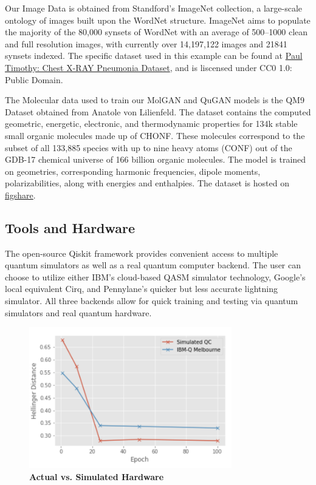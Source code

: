 \documentclass{scrartcl}
\begin{document}
Our Image Data is obtained from Standford's ImageNet collection, a large-scale ontology of images built upon the WordNet structure. ImageNet aims to populate the majority of the 80,000 synsets of WordNet with an average of 500–1000 clean and full resolution images, with currently over 14,197,122 images and 21841 synsets indexed. The specific dataset used in this example can be found at \href{https://www.kaggle.com/paultimothymooney/chest-xray-pneumonia}{Paul Timothy: Chest X-RAY Pneumonia Dataset}, and is liscensed under CC0 1.0: Public Domain.

The Molecular data used to train our MolGAN and QuGAN models is the QM9 Dataset obtained from Anatole von Lilienfeld. The dataset contains the computed geometric, energetic, electronic, and thermodynamic properties for 134k stable small organic molecules made up of CHONF. These molecules correspond to the subset of all 133,885 species with up to nine heavy atoms (CONF) out of the GDB-17 chemical universe of 166 billion organic molecules. The model is trained on geometries, corresponding harmonic frequencies, dipole moments, polarizabilities, along with energies and enthalpies. The dataset is hosted on \href{https://doi.org/10.6084/m9.figshare.c.978904.v5}{figshare}.

\subsection{Tools and Hardware}
\label{sec:org7764740}

The open-source Qiskit framework provides convenient access to multiple quantum simulators as well as a real quantum computer backend. The user can choose to utilize either IBM's cloud-based QASM simulator technology, Google's local equivalent Cirq, and Pennylane's quicker but less accurate lightning simulator. All three backends allow for quick training and testing via quantum simulators and real quantum hardware.

\begin{figure}[htbp]
\centering
\includegraphics[width=250pt]{./assets/simulatedvsreal.png}
\caption{\textbf{Actual vs. Simulated Hardware}}
\end{figure}
\end{document}
